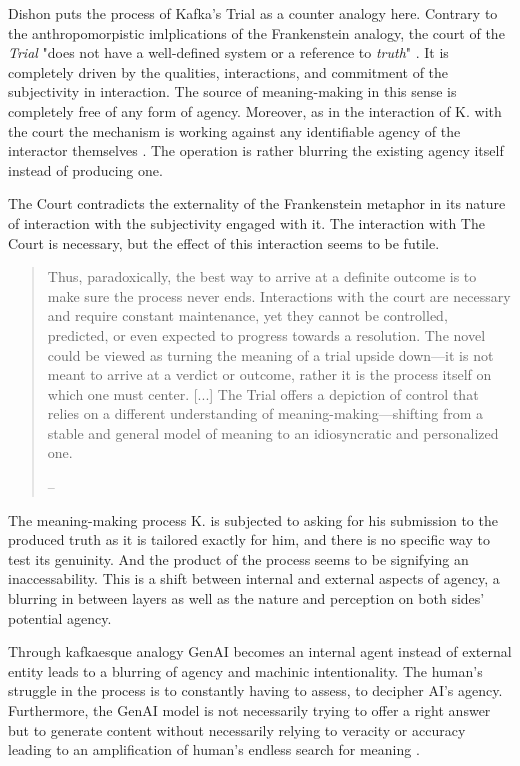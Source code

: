 Dishon \citeyear{dishon2024} puts the process of Kafka's Trial as a counter
analogy here. Contrary to the anthropomorpistic imlplications of the
Frankenstein analogy, the court of the \emph{Trial} "does not have a
well-defined system or a reference to \emph{truth}" \parencite[970]{dishon2024}. It is
completely driven by the qualities, interactions, and commitment %
of the subjectivity in interaction. The source of meaning-making in this sense
is completely free of any form of agency. Moreover, as in the interaction of K. with the court
the mechanism is working against any identifiable agency of the interactor
themselves \parencite[see 970]{dishon2024}. The operation is rather blurring
the existing agency itself instead of producing one.

The Court contradicts the externality of the Frankenstein metaphor in its
nature of interaction with the subjectivity engaged with it. The interaction
with The Court is necessary, but the effect of this interaction seems to be
futile.

\begin{quote}
	Thus, paradoxically, the best way to arrive at a definite outcome is to make sure the process never ends. Interactions with the court are necessary and require constant maintenance, yet they cannot be controlled, predicted, or even expected to progress towards a resolution. The novel could be viewed as turning the meaning of a trial upside down—it is not meant to arrive at a verdict or outcome, rather it is the process itself on which one must center. [...] The Trial offers a depiction of control that relies on a different understanding of meaning-making—shifting from a stable and general model of meaning to an idiosyncratic and personalized one.

	-- \textcite[970-972]{dishon2024}
\end{quote}

The meaning-making process K. is subjected to asking for his submission to the
produced truth as it is tailored exactly for him, and there is no specific way
to test its genuinity. And the product of the process seems to be signifying an
inaccessability. This is a shift between internal and external aspects of
agency, a blurring in between layers as well as the nature and perception on
both sides' potential agency.

Through kafkaesque analogy
GenAI becomes an internal agent instead of external entity leads to a blurring
of agency and machinic intentionality. The human's struggle in the process is
to constantly having to assess, to decipher AI's agency. Furthermore, the GenAI
model is not necessarily trying to offer a right answer but to generate content
without necessarily relying to veracity or accuracy leading to an amplification
of human's endless search for meaning \parencite[see
	977]{dishon2024}.

